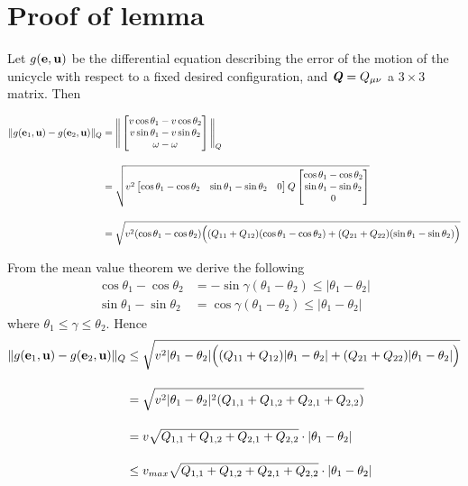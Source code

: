 \section{Proof of lemma }

Let $g(\bm{\mathbf{e}}, \bm{\mathbf{u}})$ be the differential equation describing the
error of the motion of the unicycle with respect to a fixed desired
configuration, and $\bm{\mathit{Q}} = Q_{\mu\nu}$ a $3 \times 3$ matrix. Then

\begin{align}
  \|g(\bm{\mathbf{e}}_1, \bm{\mathbf{u}}) - g(\bm{\mathbf{e}}_2, \bm{\mathbf{u}})\|_{Q} &=
  \Bigg\|
  \begin{bmatrix}
    v \cos\theta_1 - v \cos\theta_2 \\
    v \sin\theta_1 - v \sin\theta_2 \\
    \omega - \omega
  \end{bmatrix}
  \Bigg\|_Q \\[2.5ex]
  &=\sqrt{v^2
   \begin{bmatrix}
     \cos\theta_1 - \cos\theta_2 & \sin\theta_1 - \sin\theta_2 & 0
   \end{bmatrix}
   Q
   \begin{bmatrix}
     \cos\theta_1 - \cos\theta_2 \\
     \sin\theta_1 - \sin\theta_2 \\
     0
   \end{bmatrix}
  }\\[2.5ex]
  &= \sqrt{v^2 (\cos\theta_1 - \cos\theta_2)\Big( (Q_{11}+Q_{12})(\cos\theta_1 - \cos\theta_2) +
                    (Q_{21}+Q_{22})(\sin\theta_1 - \sin\theta_2)\Big)}
\end{align}

From the mean value theorem we derive the following
\begin{align}
  \cos\theta_1 - \cos\theta_2 &= -\sin\gamma (\theta_1 - \theta_2) \leq |\theta_1 - \theta_2| \\[2.5ex]
  \sin\theta_1 - \sin\theta_2 &= \cos\gamma (\theta_1 - \theta_2) \leq |\theta_1 - \theta_2|
\end{align}
where $\theta_1 \leq \gamma \leq \theta_2$. Hence
\begin{align}
  \|g(\bm{\mathbf{e}}_1, \bm{\mathbf{u}}) - g(\bm{\mathbf{e}}_2, \bm{\mathbf{u}})\|_{Q} &\leq
    \sqrt{v^2 |\theta_1 - \theta_2|
      \Big( (Q_{11}+Q_{12}) |\theta_1 - \theta_2|+ (Q_{21}+Q_{22}) |\theta_1 - \theta_2|\Big)} \\[2.5ex]
      &= \sqrt{v^2 |\theta_1 - \theta_2|^2 (Q_{1,1}+Q_{1,2}+Q_{2,1}+Q_{2,2})} \\[2.5ex]
      &= v \sqrt{Q_{1,1}+Q_{1,2}+Q_{2,1}+Q_{2,2}} \cdot |\theta_1 - \theta_2| \\[2.5ex]
      &\leq v_{max} \sqrt{Q_{1,1}+Q_{1,2}+Q_{2,1}+Q_{2,2}} \cdot |\theta_1 - \theta_2|
\end{align}
